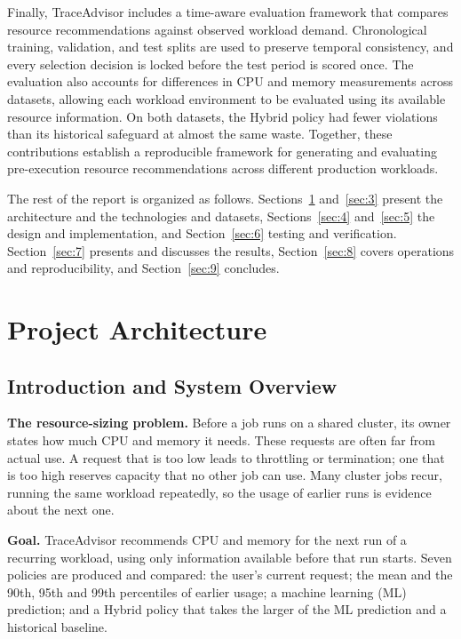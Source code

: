 \documentclass{IEEEtran}
\begin{document}
Finally, TraceAdvisor includes a time-aware evaluation framework that compares resource recommendations against observed workload demand. Chronological training, validation, and test splits are used to preserve temporal consistency, and every selection decision is locked before the test period is scored once. The evaluation also accounts for differences in CPU and memory measurements across datasets, allowing each workload environment to be evaluated using its available resource information. On both datasets, the Hybrid policy had fewer violations than its historical safeguard at almost the same waste. Together, these contributions establish a reproducible framework for generating and evaluating pre-execution resource recommendations across different production workloads.

The rest of the report is organized as follows. Sections~\ref{sec:2} and~\ref{sec:3} present the architecture and the technologies and datasets, Sections~\ref{sec:4} and~\ref{sec:5} the design and implementation, and Section~\ref{sec:6} testing and verification. Section~\ref{sec:7} presents and discusses the results, Section~\ref{sec:8} covers operations and reproducibility, and Section~\ref{sec:9} concludes.

\section{Project Architecture}\label{sec:2}

\subsection{Introduction and System Overview}\label{sec:2.1}

\textbf{The resource-sizing problem.} Before a job runs on a shared cluster, its owner states how much CPU and memory it needs. These requests are often far from actual use. A request that is too low leads to throttling or termination; one that is too high reserves capacity that no other job can use. Many cluster jobs recur, running the same workload repeatedly, so the usage of earlier runs is evidence about the next one.

\textbf{Goal.} TraceAdvisor recommends CPU and memory for the next run of a recurring workload, using only information available before that run starts. Seven policies are produced and compared: the user's current request; the mean and the 90th, 95th and 99th percentiles of earlier usage; a machine learning (ML) prediction; and a Hybrid policy that takes the larger of the ML prediction and a historical baseline.
\end{document}
